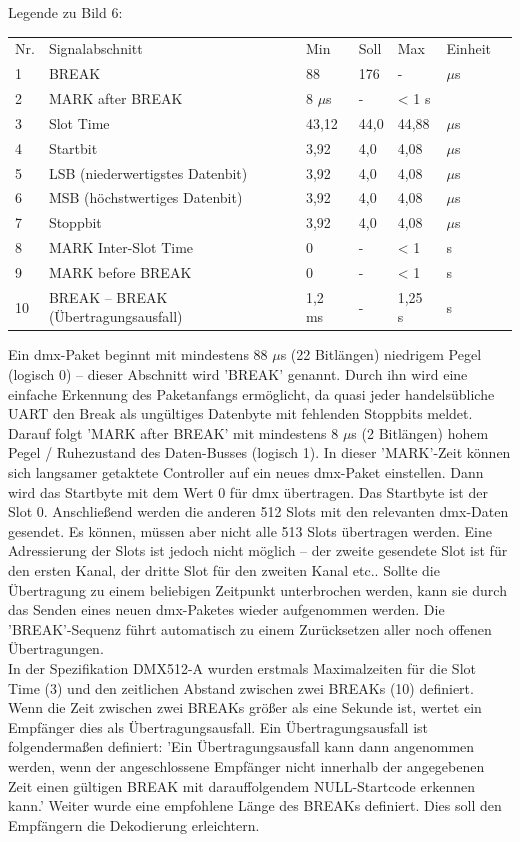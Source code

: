 \documentclass[11pt]{scrartcl}
\begin{document}
\noindent
\begin{table}[H]
    \small
    Legende zu Bild 6:\\
    \begin{tabular*}{\textwidth}{l @{\extracolsep{\fill}} llllll}
        Nr. & Signalabschnitt & Min & Soll & Max & Einheit\\
        1 & BREAK & 88 & 176 & - & $\mu$s\\
        2 & MARK after BREAK & 8 $\mu$s & - & < 1 s\\
        3 & Slot Time & 43,12 & 44,0 & 44,88 & $\mu$s\\
        4 & Startbit & 3,92 & 4,0 & 4,08 & $\mu$s\\
        5 & LSB (niederwertigstes Datenbit) & 3,92 & 4,0 & 4,08 & $\mu$s\\
        6 & MSB (höchstwertiges Datenbit) & 3,92 & 4,0 & 4,08 & $\mu$s\\
        7 & Stoppbit & 3,92 & 4,0 & 4,08 & $\mu$s\\
        8 & MARK Inter-Slot Time & 0 & - & < 1 & s\\
        9 & MARK before BREAK & 0 & - & < 1 & s\\
        10 & BREAK – BREAK (Übertragungsausfall) & 1,2 ms & - & 1,25 s & s\\
    \end{tabular*}
\end{table}
\noindent
Ein \ac{dmx}-Paket beginnt mit mindestens 88 $\mu$s (22 Bitlängen) niedrigem Pegel (logisch 0) – dieser
Abschnitt wird 'BREAK' genannt. Durch ihn wird eine einfache Erkennung des Paketanfangs
ermöglicht, da quasi jeder handelsübliche UART den Break als ungültiges Datenbyte mit fehlenden
Stoppbits meldet. Darauf folgt 'MARK after BREAK' mit mindestens 8 $\mu$s (2 Bitlängen) hohem Pegel /
Ruhezustand des Daten-Busses (logisch 1). In dieser 'MARK'-Zeit können sich langsamer getaktete
Controller auf ein neues \ac{dmx}-Paket einstellen. Dann wird das Startbyte mit dem Wert 0 für \ac{dmx}
übertragen. Das Startbyte ist der Slot 0. Anschließend werden die anderen 512 Slots mit den
relevanten \ac{dmx}-Daten gesendet. Es können, müssen aber nicht alle 513 Slots übertragen werden.
Eine Adressierung der Slots ist jedoch nicht möglich – der zweite gesendete Slot ist für den ersten
Kanal, der dritte Slot für den zweiten Kanal etc.. Sollte die Übertragung zu einem beliebigen
Zeitpunkt unterbrochen werden, kann sie durch das Senden eines neuen \ac{dmx}-Paketes wieder
aufgenommen werden. Die 'BREAK'-Sequenz führt automatisch zu einem Zurücksetzen aller noch
offenen Übertragungen.\\
In der Spezifikation DMX512-A wurden erstmals Maximalzeiten für die Slot Time (3) und den
zeitlichen Abstand zwischen zwei BREAKs (10) definiert. Wenn die Zeit zwischen zwei BREAKs größer
als eine Sekunde ist, wertet ein Empfänger dies als Übertragungsausfall. Ein Übertragungsausfall ist
folgendermaßen definiert: 'Ein Übertragungsausfall kann dann angenommen werden, wenn der
angeschlossene Empfänger nicht innerhalb der angegebenen Zeit einen gültigen BREAK mit
darauffolgendem NULL-Startcode erkennen kann.' Weiter wurde eine empfohlene Länge des
BREAKs definiert. Dies soll den Empfängern die Dekodierung erleichtern.
\clearpage
\end{document}
